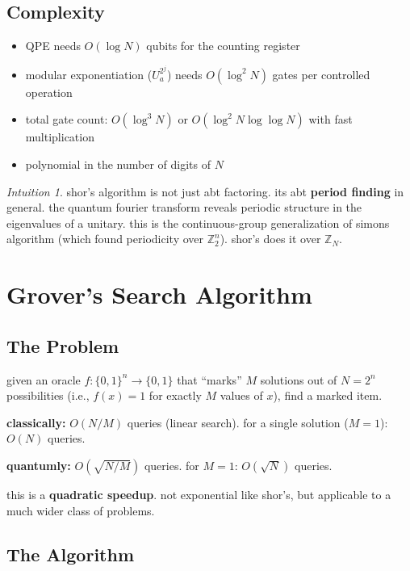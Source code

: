 \documentclass[11pt,a4paper]{article}
\theoremstyle{definition}
\theoremstyle{remark}
\newtheorem*{intuition}{Intuition}
\begin{document}
\subsection{Complexity}

\begin{itemize}
    \item QPE needs $O(\log N)$ qubits for the counting register
    \item modular exponentiation ($U_a^{2^j}$) needs $O(\log^2 N)$ gates per controlled operation
    \item total gate count: $O(\log^3 N)$ or $O(\log^2 N \log\log N)$ with fast multiplication
    \item polynomial in the number of digits of $N$
\end{itemize}

\begin{intuition}
shor's algorithm is not just abt factoring. its abt \textbf{period finding} in general. the quantum fourier transform reveals periodic structure in the eigenvalues of a unitary. this is the continuous-group generalization of simons algorithm (which found periodicity over $\mathbb{Z}_2^n$). shor's does it over $\mathbb{Z}_N$.
\end{intuition}

\section{Grover's Search Algorithm}

\subsection{The Problem}

given an oracle $f: \{0,1\}^n \to \{0,1\}$ that ``marks'' $M$ solutions out of $N = 2^n$ possibilities (i.e., $f(x) = 1$ for exactly $M$ values of $x$), find a marked item.

\textbf{classically:} $O(N/M)$ queries (linear search). for a single solution ($M = 1$): $O(N)$ queries.

\textbf{quantumly:} $O(\sqrt{N/M})$ queries. for $M = 1$: $O(\sqrt{N})$ queries.

this is a \textbf{quadratic speedup}. not exponential like shor's, but applicable to a much wider class of problems.

\subsection{The Algorithm}
\end{document}
